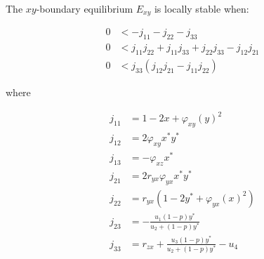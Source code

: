 \begin{theorem}\label{thm:eq-boundary-xy-stability}
    The $xy$-boundary equilibrium $E_{xy}$ is locally stable when:

    \begin{align*}
        0 &< -j_{11}-j_{22}-j_{33}\\
        0 &< j_{11}j_{22}+j_{11}j_{33}+j_{22}j_{33}-j_{12}j_{21}\\
        0 &< j_{33}\left(j_{12}j_{21}-j_{11}j_{22}\right)
    \end{align*}

    where
    
    \begin{align*}
        j_{11} &= 1-2x+\varphi_{xy}\left(y\right)^2\\
        j_{12} &= 2\varphi_{xy}x^*y^*\\
        j_{13} &= -\varphi_{xz}x^*\\
        j_{21} &= 2r_{yx}\varphi_{yx}x^*y^*\\
        j_{22} &= r_{yx}\left(1-2y^*+\varphi_{yx}\left(x\right)^2\right)\\
        j_{23} &= -\frac{u_1\left(1-p\right)y^*}{u_2+\left(1-p\right)y^*}\\
        j_{33} &= r_{zx}+\frac{u_3\left(1-p\right)y^*}{u_2+\left(1-p\right)y^*}-u_4
    \end{align*}
\end{theorem}
